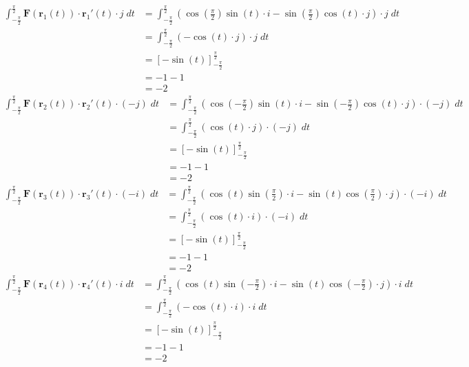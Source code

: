 \documentclass[12pt, a4paper]{article}
\begin{document}
\begin{equation}
    \begin{split}
        \int_{-\frac{\pi}{2}}^{\frac{\pi}{2}} \textbf{F}(\textbf{r}_1(t)) \cdot \textbf{r}_1'(t) \cdot j \; dt &= \int_{-\frac{\pi}{2}}^{\frac{\pi}{2}} (\cos\left(\frac{\pi}{2}\right)\sin(t) \cdot i - \sin\left(\frac{\pi}{2}\right)\cos(t) \cdot j) \cdot j \; dt \\
        &= \int_{-\frac{\pi}{2}}^{\frac{\pi}{2}} (- \cos(t) \cdot j) \cdot j \; dt \\
        &= \left[- \sin(t) \right]_{-\frac{\pi}{2}}^{\frac{\pi}{2}} \\
        &= - 1 - 1 \\
        &= -2
    \end{split}
\end{equation}
\begin{equation}
    \begin{split}
        \int_{-\frac{\pi}{2}}^{\frac{\pi}{2}} \textbf{F}(\textbf{r}_2(t)) \cdot \textbf{r}_2'(t) \cdot (-j) \; dt &= \int_{-\frac{\pi}{2}}^{\frac{\pi}{2}} (\cos(-\frac{\pi}{2})\sin(t) \cdot i - \sin(-\frac{\pi}{2})\cos(t) \cdot j) \cdot (-j) \; dt \\
        &= \int_{-\frac{\pi}{2}}^{\frac{\pi}{2}} (\cos(t) \cdot j) \cdot (-j) \; dt \\
        &= \left[- \sin(t) \right]_{-\frac{\pi}{2}}^{\frac{\pi}{2}} \\
        &= - 1 - 1 \\
        &= -2
    \end{split}
\end{equation}
\begin{equation}
    \begin{split}
        \int_{-\frac{\pi}{2}}^{\frac{\pi}{2}} \textbf{F}(\textbf{r}_3(t)) \cdot \textbf{r}_3'(t) \cdot (-i) \; dt &= \int_{-\frac{\pi}{2}}^{\frac{\pi}{2}} (\cos(t)\sin\left(\frac{\pi}{2}\right) \cdot i - \sin(t)\cos\left(\frac{\pi}{2}\right) \cdot j) \cdot (-i) \; dt \\
        &= \int_{-\frac{\pi}{2}}^{\frac{\pi}{2}} (\cos(t) \cdot i) \cdot (-i) \; dt \\
        &= \left[- \sin(t) \right]_{-\frac{\pi}{2}}^{\frac{\pi}{2}} \\
        &= - 1 - 1 \\
        &= -2
    \end{split}
\end{equation}
\begin{equation}
    \begin{split}
        \int_{-\frac{\pi}{2}}^{\frac{\pi}{2}} \textbf{F}(\textbf{r}_4(t)) \cdot \textbf{r}_4'(t) \cdot i \; dt &= \int_{-\frac{\pi}{2}}^{\frac{\pi}{2}} (\cos(t)\sin\left(-\frac{\pi}{2}\right) \cdot i - \sin(t)\cos\left(-\frac{\pi}{2}\right) \cdot j) \cdot i \; dt \\
        &= \int_{-\frac{\pi}{2}}^{\frac{\pi}{2}} (- \cos(t) \cdot i) \cdot i \; dt \\
        &= \left[- \sin(t) \right]_{-\frac{\pi}{2}}^{\frac{\pi}{2}} \\
        &= - 1 - 1 \\
        &= -2
    \end{split}
\end{equation}
\end{document}
